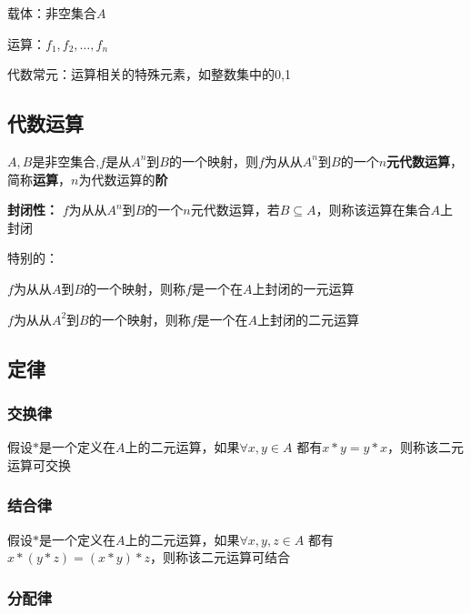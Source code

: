 \documentclass{article}
\begin{document}
载体：非空集合$A$

运算：$f_1,f_2,\dots,f_n$

代数常元：运算相关的特殊元素，如整数集中的0,1


\subsection{代数运算}

$A,B$是非空集合,$f$是从$A^n$到$B$的一个映射，则$f$为从从$A^n$到$B$的一个\textbf{$n$元代数运算}，简称\textbf{运算}，$n$为代数运算的\textbf{阶}

\textbf{封闭性：} $f$为从从$A^n$到$B$的一个$n$元代数运算，若$B \subseteq A $，则称该运算在集合$A$上封闭

特别的：

$f$为从从$A$到$B$的一个映射，则称$f$是一个在$A$上封闭的一元运算

$f$为从从$A^2$到$B$的一个映射，则称$f$是一个在$A$上封闭的二元运算


\subsection{定律}

\subsubsection{交换律}

假设$*$是一个定义在$A$上的二元运算，如果$\forall x,y \in A$ 都有$x*y = y*x$，则称该二元运算可交换

\subsubsection{结合律}

假设$*$是一个定义在$A$上的二元运算，如果$\forall x,y,z \in A$ 都有$x*(y*z) = (x*y)*z$，则称该二元运算可结合

\subsubsection{分配律}
\end{document}
